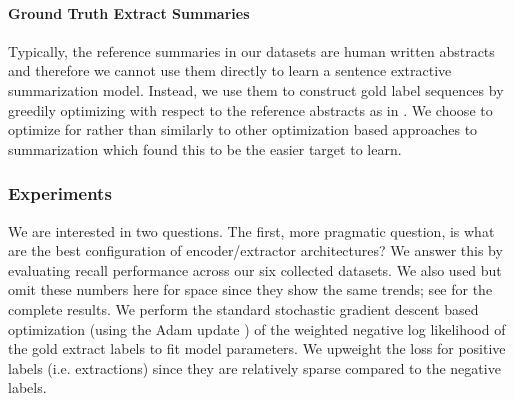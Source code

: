 \paragraph{Ground Truth Extract Summaries}
Typically, the reference summaries in our datasets are human written
abstracts and therefore we cannot use them directly to learn a sentence 
extractive summarization model.
Instead, we use them to construct gold label sequences
by greedily optimizing  with respect to the reference abstracts
as in \cite{nallapati2016summarunner}.
We choose to optimize for  rather than 
 similarly to other optimization based approaches to summarization 
\cite{sipos2012large,durrett2016learning,nallapati2016summarunner} 
which found this to be the easier target to learn.






\subsubsection{Experiments}

 We are interested in two questions. The first, more pragmatic question, is
 what are the best configuration of encoder/extractor architectures?
 We answer this by evaluating \rouge{} recall
performance across our six collected datasets.
 We also used \meteor{} 
\cite{denkowski:lavie:meteor-wmt:2014} but omit these numbers here
for space since they
show the same trends; see \cite{kedzie2018deep} for the complete results.
  We perform the standard
 stochastic gradient descent based optimization (using the Adam
 update \cite{kingma2014adam}) of the weighted negative log likelihood 
 of the gold extract labels to fit model parameters. We upweight the loss for positive labels (i.e.
 extractions) since they are relatively sparse compared to the negative 
 labels.



